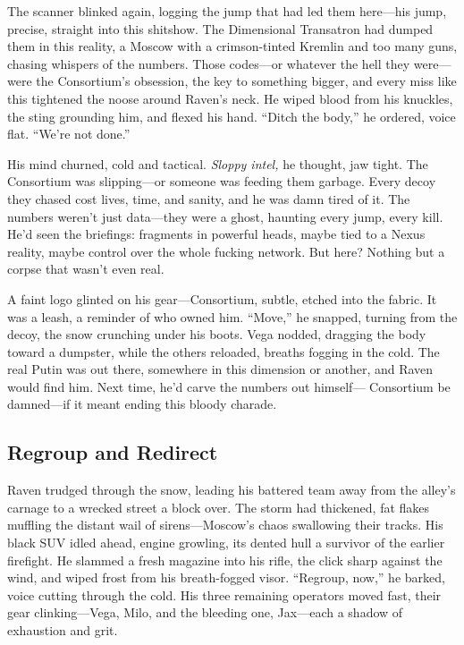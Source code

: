 \documentclass[12pt]{book}
\begin{document}
The scanner blinked again, logging the jump that had led them here—his jump, precise, straight into this shitshow. The Dimensional Transatron had dumped them in this reality, a Moscow with a crimson-tinted Kremlin and too many guns, chasing whispers of the numbers. Those codes—or whatever the hell they were—were the Consortium’s obsession, the key to something bigger, and every miss like this tightened the noose around Raven’s neck. He wiped blood from his knuckles, the sting grounding him, and flexed his hand. “Ditch the body,” he ordered, voice flat. “We’re not done.”

His mind churned, cold and tactical. \textit{Sloppy intel,} he thought, jaw tight. The Consortium was slipping—or someone was feeding them garbage. Every decoy they chased cost lives, time, and sanity, and he was damn tired of it. The numbers weren’t just data—they were a ghost, haunting every jump, every kill. He’d seen the briefings: fragments in powerful heads, maybe tied to a Nexus reality, maybe control over the whole fucking network. But here? Nothing but a corpse that wasn’t even real.

A faint logo glinted on his gear—Consortium, subtle, etched into the fabric. It was a leash, a reminder of who owned him. “Move,” he snapped, turning from the decoy, the snow crunching under his boots. Vega nodded, dragging the body toward a dumpster, while the others reloaded, breaths fogging in the cold. The real Putin was out there, somewhere in this dimension or another, and Raven would find him. Next time, he’d carve the numbers out himself— Consortium be damned—if it meant ending this bloody charade.

\subsection{Regroup and Redirect}

Raven trudged through the snow, leading his battered team away from the alley’s carnage to a wrecked street a block over. The storm had thickened, fat flakes muffling the distant wail of sirens—Moscow’s chaos swallowing their tracks. His black SUV idled ahead, engine growling, its dented hull a survivor of the earlier firefight. He slammed a fresh magazine into his rifle, the click sharp against the wind, and wiped frost from his breath-fogged visor. “Regroup, now,” he barked, voice cutting through the cold. His three remaining operators moved fast, their gear clinking—Vega, Milo, and the bleeding one, Jax—each a shadow of exhaustion and grit.
\end{document}
